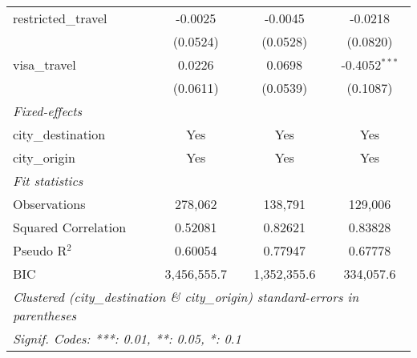 \begin{tabular}{lccc}
   restricted\_travel                & -0.0025         & -0.0045         & -0.0218\\   
                                     & (0.0524)        & (0.0528)        & (0.0820)\\   
   visa\_travel                      & 0.0226          & 0.0698          & -0.4052$^{***}$\\   
                                     & (0.0611)        & (0.0539)        & (0.1087)\\   
   \midrule
   \emph{Fixed-effects}\\
   city\_destination                 & Yes             & Yes             & Yes\\  
   city\_origin                      & Yes             & Yes             & Yes\\  
   \midrule
   \emph{Fit statistics}\\
   Observations                      & 278,062         & 138,791         & 129,006\\  
   Squared Correlation               & 0.52081         & 0.82621         & 0.83828\\  
   Pseudo R$^2$                      & 0.60054         & 0.77947         & 0.67778\\  
   BIC                               & 3,456,555.7     & 1,352,355.6     & 334,057.6\\  
   \midrule \midrule
   \multicolumn{4}{l}{\emph{Clustered (city\_destination \& city\_origin) standard-errors in parentheses}}\\
   \multicolumn{4}{l}{\emph{Signif. Codes: ***: 0.01, **: 0.05, *: 0.1}}\\
\end{tabular}
\par\endgroup


